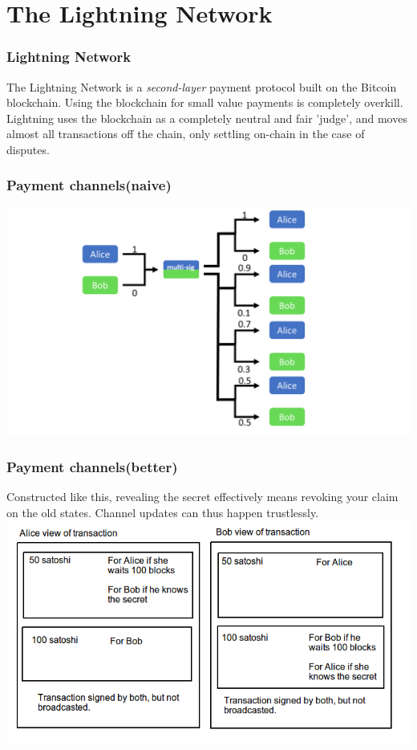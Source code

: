 \documentclass{beamer}
\begin{document}
\section{The Lightning Network}
\begin{frame}
\frametitle{Lightning Network}
The Lightning Network is a \textit{second-layer} payment protocol built on the Bitcoin blockchain. Using the blockchain for small value payments is completely overkill. Lightning uses the blockchain as a completely neutral and fair 'judge', and moves almost all transactions off the chain, only settling on-chain in the case of disputes. 
\end{frame}
\begin{frame}
\frametitle{Payment channels(naive)}
\includegraphics[scale=0.3]{images/channel.png}

\end{frame}
\begin{frame}
\frametitle{Payment channels(better)}
Constructed like this, revealing the secret effectively means revoking your claim on the old states. Channel updates can thus happen trustlessly.
\includegraphics[scale=0.4]{images/asymmetry.png}

\end{frame}
\end{document}

